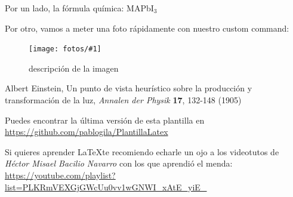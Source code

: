 \documentclass[12pt,a4paper]{article}
\newcommand{\MA}{MAPbI$_3$}
\newcommand{\NEWPIC}[3]{
\begin{figure}[H]
    \centering
    \texttt{[image: fotos/\#1]}
    \caption{#3}
    \label{#1}
    \end{figure}
    }
\begin{document}
Por un lado, la fórmula química: {\MA}

Por otro, vamos a meter una foto rápidamente con nuestro custom command:

\NEWPIC{escudo}{0.4}{descripción de la imagen}




\newpage









\begin{thebibliography}{99} %

 Albert Einstein, Un punto de vista heurístico sobre la producción y transformación de la luz, \textit{Annalen der Physik} \textbf{17}, 132-148 (1905)

 Puedes encontrar la última versión de esta plantilla en \url{https://github.com/pablogila/PlantillaLatex}

 Si quieres aprender \LaTeX te recomiendo echarle un ojo a los videotutos de \textit{Héctor Misael Bacilio Navarro} con los que aprendió el menda: \url{https://youtube.com/playlist?list=PLKRmVEXGjGWcUu0vv1wGNWI_xAtE_yiE_}

\end{thebibliography}
\end{document}

